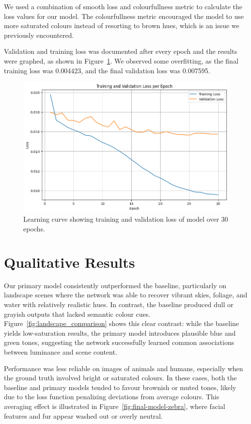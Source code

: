 \documentclass{article} %
\begin{document}
We used a combination of smooth loss and colourfullness metric to calculate the loss values for our model. The colourfullness metric encouraged the model to use more saturated colours
instead of resorting to brown hues, which is an issue we previously encountered. 

Validation and training loss was documented after every epoch and the results were graphed, as shown in Figure~\ref{fig:loss_curve}. We observed some overfitting, as the final training loss was 0.004423, 
and the final validation loss was 0.007595.

\begin{figure}[htbp]            %
  \centering
  \includegraphics[width=0.9\linewidth]{Figs/loss_curve.png}
  \caption{Learning curve showing training and validation loss of model over 30 epochs.}
  \label{fig:loss_curve}
\end{figure}

\section{Qualitative Results}
\label{qual_results}

Our primary model consistently outperformed the baseline, particularly on landscape scenes where the network was able to recover vibrant skies, foliage, and water with relatively 
realistic hues. In contrast, the baseline produced dull or grayish outputs that lacked semantic colour cues. Figure~\ref{fig:landscape_comparison} shows this clear contrast: while 
the baseline yields low-saturation results, the primary model introduces plausible blue and green tones, suggesting the network successfully learned common associations between luminance 
and scene content.

Performance was less reliable on images of animals and humans, especially when the ground truth involved bright or saturated colours. In these cases, both the baseline and primary models 
tended to favour brownish or muted tones, likely due to the loss function penalizing deviations from average colours. This averaging effect is illustrated in Figure~\ref{fig:final-model-zebra},
where facial features and fur appear washed out or overly neutral.
\end{document}
